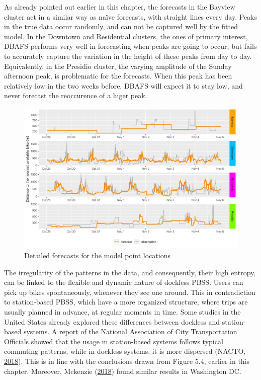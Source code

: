 \documentclass[12pt,oneside]{reedthesis}
\begin{document}
As already pointed out earlier in this chapter, the forecasts in the
Bayview cluster act in a similar way as naïve forecasts, with straight
lines every day. Peaks in the true data occur randomly, and can not be
captured well by the fitted model. In the Downtown and Residential
clusters, the ones of primary interest, DBAFS performs very well in
forecasting when peaks are going to occur, but fails to accurately
capture the variation in the height of these peaks from day to day.
Equivalently, in the Presidio cluster, the varying amplitude of the
Sunday afternoon peak, is problematic for the forecasts. When this peak
has been relatively low in the two weeks before, DBAFS will expect it to
stay low, and never forecast the reoccurence of a higer peak.
\begin{figure}[H]
\includegraphics[width=\textwidth]{Figures/forecastplot} \caption{Detailed forecasts for the model point locations}\label{fig:forecastplot}
\end{figure}
The irregularity of the patterns in the data, and consequently, their
high entropy, can be linked to the flexible and dynamic nature of
dockless PBSS. Users can pick up bikes spontaneously, whenever they see
one around. This in contradiction to station-based PBSS, which have a
more organized structure, where trips are usually planned in advance, at
regular moments in time. Some studies in the United States already
explored these differences between dockless and station-based systems. A
report of the National Association of City Transportation Officials
showed that the usage in station-based systems follows typical commuting
patterns, while in dockless systems, it is more dispersed (NACTO,
\protect\hyperlink{ref-nacto2018}{2018}). This is in line with the
conclusions drawn from Figure 5.4, earlier in this chapter. Moreover,
Mckenzie (\protect\hyperlink{ref-mckenzie2018}{2018}) found similar
results in Washington DC.
\end{document}
